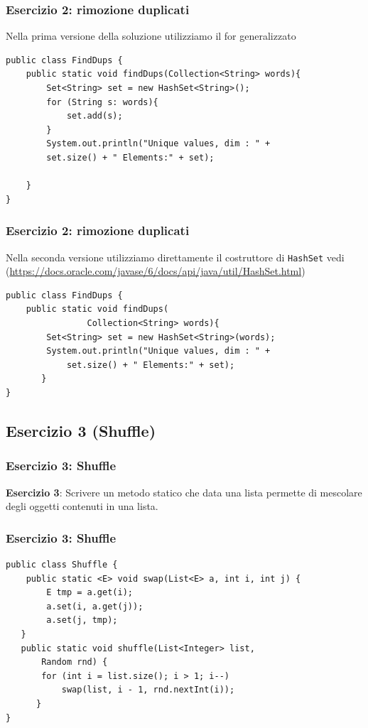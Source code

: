 \documentclass{beamer}
\begin{document}
\begin{frame}[fragile]
\frametitle{Esercizio 2: rimozione duplicati}
Nella prima versione della soluzione utilizziamo il for generalizzato
\begin{framed}
\begin{lstlisting}
public class FindDups {
	public static void findDups(Collection<String> words){
		Set<String> set = new HashSet<String>();
		for (String s: words){
			set.add(s);
		}
		System.out.println("Unique values, dim : " + 
		set.size() + " Elements:" + set);
			
	}
}
\end{lstlisting}
\end{framed}
\end{frame}

\begin{frame}[fragile]
\frametitle{Esercizio 2: rimozione duplicati}
Nella seconda versione utilizziamo direttamente il costruttore di \texttt{HashSet} vedi (\url{https://docs.oracle.com/javase/6/docs/api/java/util/HashSet.html})
\begin{framed}
\begin{lstlisting}
public class FindDups {
    public static void findDups(
                Collection<String> words){
        Set<String> set = new HashSet<String>(words);
        System.out.println("Unique values, dim : " + 
            set.size() + " Elements:" + set);
       }
}
\end{lstlisting}
\end{framed}
\end{frame}

\subsection{Esercizio 3 (Shuffle)}
\begin{frame}[fragile]
\frametitle{Esercizio 3: Shuffle}
\begin{framed}
\textbf{Esercizio 3}: Scrivere un metodo statico che data una lista permette di mescolare degli oggetti contenuti in una lista.
\end{framed}
\end{frame}

\begin{frame}[fragile]
\frametitle{Esercizio 3: Shuffle}
\begin{framed}
\begin{lstlisting}
public class Shuffle {
    public static <E> void swap(List<E> a, int i, int j) {
        E tmp = a.get(i);
        a.set(i, a.get(j));
        a.set(j, tmp);
   }
   public static void shuffle(List<Integer> list, 
       Random rnd) {
       for (int i = list.size(); i > 1; i--)
           swap(list, i - 1, rnd.nextInt(i));
      }
}
\end{lstlisting}
\end{framed}
\end{frame}
\end{document}

